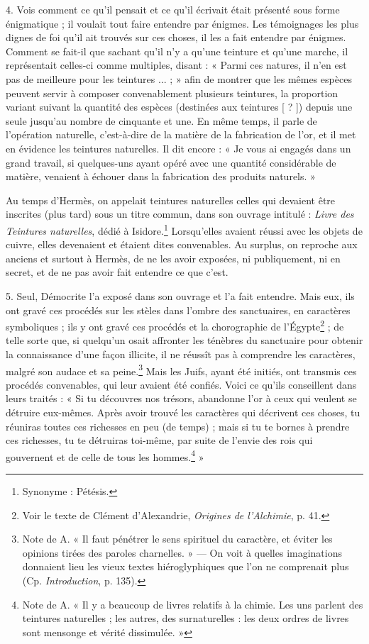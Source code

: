 \documentclass[a4paper, 11pt, oneside, polutonikogreek, french]{article}
\begin{document}
4. Vois comment ce qu'il pensait et ce qu'il écrivait était présenté sous forme énigmatique ; il voulait tout faire entendre par énigmes. Les témoignages les plus dignes de foi qu'il ait trouvés sur ces choses, il les a fait entendre par énigmes. Comment se fait-il que sachant qu'il n'y a qu'une teinture et qu'une marche, il représentait celles-ci comme multiples, disant : « Parmi ces natures, il n'en est pas de meilleure pour les teintures ... ; » afin de montrer que les mêmes espèces peuvent servir à composer convenablement plusieurs teintures, la proportion variant suivant la quantité des espèces (destinées aux teintures [ ? ]) depuis une seule jusqu'au nombre de cinquante et une. En même temps, il parle de l'opération naturelle, c'est-à-dire de la matière de la fabrication de l'or, et il met en évidence les teintures naturelles. Il dit encore : « Je vous ai engagés dans un grand travail, si quelques-uns ayant opéré avec une quantité considérable de matière, venaient à échouer dans la fabrication des produits naturels. »

Au temps d'Hermès, on appelait teintures naturelles celles qui devaient être inscrites (plus tard) sous un titre commun, dans son ouvrage intitulé : \emph{Livre des Teintures naturelles}, dédié à Isidore.\footnote{Synonyme : Pétésis.} Lorsqu'elles avaient réussi avec les objets de cuivre, elles devenaient et étaient dites convenables. Au surplus, on reproche aux anciens et surtout à Hermès, de ne les avoir exposées, ni publiquement, ni en secret, et de ne pas avoir fait entendre ce que c'est.

5. Seul, Démocrite l'a exposé dans son ouvrage et l'a fait entendre. Mais eux, ils ont gravé ces procédés sur les stèles dans l'ombre des sanctuaires, en caractères symboliques ; ils y ont gravé ces procédés et la chorographie de l'Égypte\footnote{Voir le texte de Clément d'Alexandrie, \emph{Origines de l'Alchimie}, p. 41.} ; de telle sorte que, si quelqu'un osait affronter les ténèbres du sanctuaire pour obtenir la connaissance d'une façon illicite, il ne réussît pas à comprendre les caractères, malgré son audace et sa peine.\footnote{Note de A. « Il faut pénétrer le sens spirituel du caractère, et éviter les opinions tirées des paroles charnelles. » --- On voit à quelles imaginations donnaient lieu les vieux textes hiéroglyphiques que l'on ne comprenait plus (Cp. \emph{Introduction}, p. 135).} Mais les Juifs, ayant été initiés, ont transmis ces procédés convenables, qui leur avaient été confiés. Voici ce qu'ils conseillent dans leurs traités : « Si tu découvres nos trésors, abandonne l'or à ceux qui veulent se détruire eux-mêmes. Après avoir trouvé les caractères qui décrivent ces choses, tu réuniras toutes ces richesses en peu (de temps) ; mais si tu te bornes à prendre ces richesses, tu te détruiras toi-même, par suite de l'envie des rois qui gouvernent et de celle de tous les hommes.\footnote{Note de A. « Il y a beaucoup de livres relatifs à la chimie. Les uns parlent des teintures naturelles ; les autres, des surnaturelles : les deux ordres de livres sont mensonge et vérité dissimulée. »} »
\end{document}
